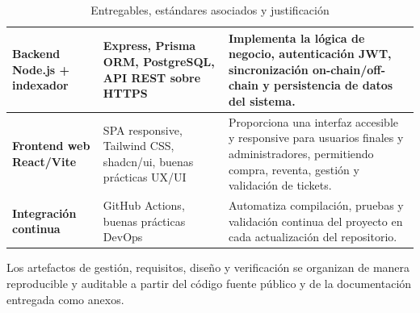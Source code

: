 \begin{table}[H]
\begin{tabular}{|p{3.5cm}|p{4cm}|p{7cm}|}
\textbf{Backend Node.js + indexador} &
Express, Prisma ORM, PostgreSQL, API REST sobre HTTPS &
Implementa la lógica de negocio, autenticación JWT, sincronización on-chain/off-chain y persistencia de datos del sistema. \\ \hline

\textbf{Frontend web React/Vite} &
SPA responsive, Tailwind CSS, shadcn/ui, buenas prácticas UX/UI &
Proporciona una interfaz accesible y responsive para usuarios finales y administradores, permitiendo compra, reventa, gestión y validación de tickets. \\ \hline

\textbf{Integración continua} &
GitHub Actions, buenas prácticas DevOps &
Automatiza compilación, pruebas y validación continua del proyecto en cada actualización del repositorio. \\ \hline

\end{tabular}

\caption{Entregables, estándares asociados y justificación}
\label{tab:entregables_completos}
\normalsize
\end{table}

Los artefactos de gestión, requisitos, diseño y verificación se organizan de manera reproducible y auditable
a partir del código 
fuente público y de la documentación entregada como anexos.
